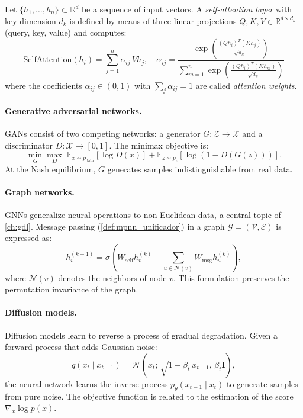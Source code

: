 \begin{definition}\label{def:self_attention_basica}
Let $\{h_1, \ldots, h_n\} \subset \mathbb{R}^d$ be a sequence of input vectors. A \textit{self-attention layer} with key dimension $d_k$ is defined by means of three linear projections $Q, K, V \in \mathbb{R}^{d \times d_k}$ (query, key, value) and computes:
\[
\mathrm{SelfAttention}(h_i) = \sum_{j=1}^n \alpha_{ij}\, V h_j, \quad \alpha_{ij} = \frac{\exp\!\left(\frac{(Qh_i)^T(Kh_j)}{\sqrt{d_k}}\right)}{\sum_{m=1}^n \exp\!\left(\frac{(Qh_i)^T(Kh_m)}{\sqrt{d_k}}\right)}
\]
where the coefficients $\alpha_{ij} \in (0,1)$ with $\sum_j \alpha_{ij} = 1$ are called \textit{attention weights}.
\end{definition}

\paragraph{Generative adversarial networks.}
\glspl{GAN} consist of two competing networks: a generator $G: \mathcal{Z} \to \mathcal{X}$ and a discriminator $D: \mathcal{X} \to [0,1]$. The minimax objective is:
\[
	\min_G \max_D\; \mathbb{E}_{x \sim p_{\text{data}}}[\log D(x)] + \mathbb{E}_{z \sim p_z}[\log(1 - D(G(z)))].
\]
At the Nash equilibrium, $G$ generates samples indistinguishable from real data.

\paragraph{Graph networks.}
\glspl{GNN} generalize neural operations to non-Euclidean data, a central topic of \autoref{ch:gdl}. Message passing (\autoref{def:mpnn_unificador}) in a graph $\mathcal{G} = (\mathcal{V}, \mathcal{E})$ is expressed as:
\[
	h_v^{(k+1)} = \sigma\!\left(W_{\text{self}}h_v^{(k)} + \sum_{u \in \mathcal{N}(v)} W_{\text{msg}}h_u^{(k)}\right),
\]
where $\mathcal{N}(v)$ denotes the neighbors of node $v$. This formulation preserves the permutation invariance of the graph.

\paragraph{Diffusion models.}
Diffusion models learn to reverse a process of gradual degradation. Given a forward process that adds Gaussian noise:
\[
	q(x_t \mid x_{t-1}) = \mathcal{N}\!\left(x_t;\, \sqrt{1-\beta_t}\, x_{t-1},\, \beta_t \mathbf{I}\right),
\]
the neural network learns the inverse process $p_\theta(x_{t-1} \mid x_t)$ to generate samples from pure noise. The objective function is related to the estimation of the score $\nabla_x \log p(x)$.
